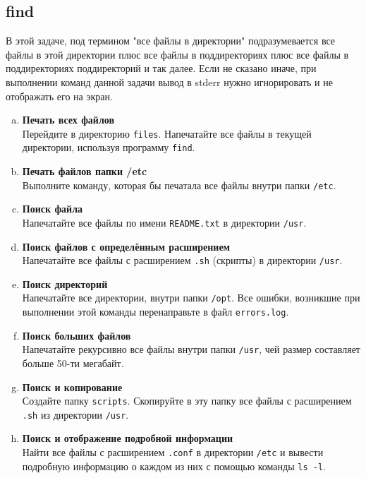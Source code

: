 \documentclass{article}
\begin{document}
\subsection{find}
В этой задаче, под термином "все файлы в директории" подразумевается все файлы в этой директории плюс все файлы в поддиректориях плюс все файлы в поддиректориях поддиректорий и так далее. Если не сказано иначе, при выполнении команд данной задачи вывод в stderr нужно игнорировать и не отображать его на экран.

\begin{enumerate}[a.]
\item \textbf{Печать всех файлов}\\
Перейдите в директорию \texttt{files}. Напечатайте все файлы в текущей директории, используя программу \texttt{find}.

\item \textbf{Печать файлов папки /etc}\\
Выполните команду, которая бы печатала все файлы внутри папки \texttt{/etc}.

\item \textbf{Поиск файла}\\
Напечатайте все файлы по имени \texttt{README.txt} в директории \texttt{/usr}.

\item \textbf{Поиск файлов с определённым расширением}\\
Напечатайте все файлы с расширением \texttt{.sh} (скрипты) в директории \texttt{/usr}.

\item \textbf{Поиск директорий}\\
Напечатайте все директории, внутри папки \texttt{/opt}. Все ошибки, возникшие при выполнении этой команды перенаправьте в файл \texttt{errors.log}.

\item \textbf{Поиск больших файлов}\\
Напечатайте рекурсивно все файлы внутри папки \texttt{/usr}, чей размер составляет больше 50-ти мегабайт.

\item \textbf{Поиск и копирование}\\
Создайте папку \texttt{scripts}. Скопируйте в эту папку все файлы с расширением \texttt{.sh} из директории \texttt{/usr}. 

\item \textbf{Поиск и отображение подробной информации}\\
Найти все файлы с расширением \texttt{.conf} в директории \texttt{/etc} и вывести подробную информацию о каждом из них с помощью команды \texttt{ls -l}.


\end{enumerate}
\end{document}
